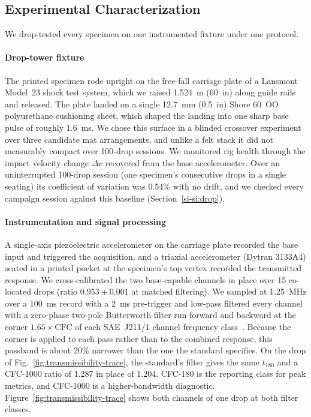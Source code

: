 \documentclass[lineno,nocopyright,upint,varvw,hyphenate]{asmejour}
\newcommand{\siref}[1]{\ref*{si-#1}}
\begin{document}
\subsection{Experimental Characterization}
\label{sec:methods:testing}

We drop-tested every specimen on one instrumented fixture under one
protocol.

\paragraph{Drop-tower fixture} The printed specimen rode upright on the
free-fall carriage plate of a Lansmont Model~23 shock test system, which
we raised \SI{1.524}{m} (\SI{60}{in}) along guide rails and released.
The plate landed on a single \SI{12.7}{mm} (\SI{0.5}{in}) Shore 60~OO polyurethane
cushioning sheet, which shaped the landing into one sharp base pulse of
roughly \SI{1.6}{ms}. We chose this surface in a blinded crossover
experiment over three candidate mat arrangements, and unlike a felt
stack it did not measurably compact over 100-drop sessions. We monitored
rig health through the impact velocity change $\Delta v$ recovered from
the base accelerometer. Over an uninterrupted 100-drop session (one
specimen's consecutive drops in a single seating) its
coefficient of variation was 0.54\% with no drift, and we checked every
campaign session against this baseline (Section~\siref{si:drop}).

\paragraph{Instrumentation and signal processing} A single-axis
piezoelectric accelerometer on the carriage plate recorded the base
input and triggered the acquisition, and a triaxial accelerometer
(Dytran 3133A4) seated in a printed pocket at the specimen's top vertex
recorded the transmitted response. We cross-calibrated the two
base-capable channels in place over 15 co-located drops (ratio
$0.953 \pm 0.001$ at matched filtering). We sampled at \SI{1.25}{MHz}
over a \SI{100}{ms} record with a \SI{2}{ms} pre-trigger and low-pass
filtered every channel with a zero-phase two-pole Butterworth filter run
forward and backward at the corner $1.65 \times \mathrm{CFC}$ of each
SAE~J211/1 channel frequency class~\citep{saej211}. Because the corner
is applied to each pass rather than to the combined response, this
passband is about 20\% narrower than the one the standard specifies. On
the drop of Fig.~\ref{fig:transmissibility-trace}, the standard's
filter gives the same $t_{180}$ and a CFC-1000 ratio of 1.287 in place of
1.204. CFC-180 is the reporting class for peak metrics, and
CFC-1000 is a higher-bandwidth diagnostic.
Figure~\ref{fig:transmissibility-trace} shows both channels of one drop
at both filter classes.
\end{document}
